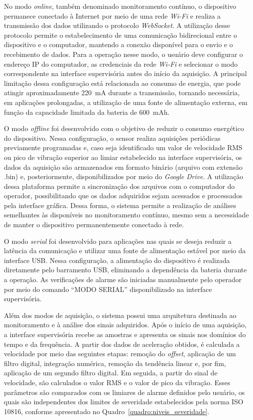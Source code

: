 \documentclass[conference]{IEEEtran}
\begin{document}
No modo \textit{online}, também denominado monitoramento contínuo, o dispositivo permanece conectado à Internet por meio de uma rede \textit{Wi-Fi} e realiza a transmissão dos dados utilizando o protocolo \textit{WebSocket}. A utilização desse protocolo permite o estabelecimento de uma comunicação bidirecional entre o dispositivo e o computador, mantendo a conexão disponível para o envio e o recebimento de dados. Para a operação nesse modo, o usuário deve configurar o endereço IP do computador, as credenciais da rede \textit{Wi-Fi} e selecionar o modo correspondente na interface supervisória antes do início da aquisição. A principal limitação dessa configuração está relacionada ao consumo de energia, que pode atingir aproximadamente 220~mA durante a transmissão, tornando necessária, em aplicações prolongadas, a utilização de uma fonte de alimentação externa, em função da capacidade limitada da bateria de 600~mAh.

O modo \textit{offline} foi desenvolvido com o objetivo de reduzir o consumo energético do dispositivo. Nessa configuração, o sensor realiza aquisições periódicas previamente programadas e, caso seja identificado um valor de velocidade RMS ou pico de vibração superior ao limiar estabelecido na interface supervisória, os dados da aquisição são armazenados em formato binário (arquivo com extensão .bin) e, posteriormente, disponibilizados por meio do \textit{Google Drive}. A utilização dessa plataforma permite a sincronização dos arquivos com o computador do operador, possibilitando que os dados adquiridos sejam acessados e processados pela interface gráfica. Dessa forma, o sistema permite a realização de análises semelhantes às disponíveis no monitoramento contínuo, mesmo sem a necessidade de manter o dispositivo permanentemente conectado à rede.

O modo \textit{serial} foi desenvolvido para aplicações nas quais se deseja reduzir a latência da comunicação e utilizar uma fonte de alimentação estável por meio da interface USB. Nessa configuração, a alimentação do dispositivo é realizada diretamente pelo barramento USB, eliminando a dependência da bateria durante a operação. As verificações de alarme são iniciadas manualmente pelo operador por meio do comando ``MODO SERIAL'' disponibilizado na interface supervisória.

Além dos modos de aquisição, o sistema possui uma arquitetura destinada ao monitoramento e à análise dos sinais adquiridos. Após o início de uma aquisição, a interface supervisória recebe as amostras e apresenta os sinais nos domínios do tempo e da frequência. A partir dos dados de aceleração obtidos, é calculada a velocidade por meio das seguintes etapas: remoção do \textit{offset}, aplicação de um filtro digital, integração numérica, remoção da tendência linear e, por fim, aplicação de um segundo filtro digital. Em seguida, a partir do sinal de velocidade, são calculados o valor RMS e o valor de pico da vibração. Esses parâmetros são comparados com os limiares de alarme definidos pelo usuário, os quais são independentes dos limites de severidade estabelecidos pela norma ISO 10816, conforme apresentado no Quadro~\ref{quadro:niveis_severidade}.
\end{document}
